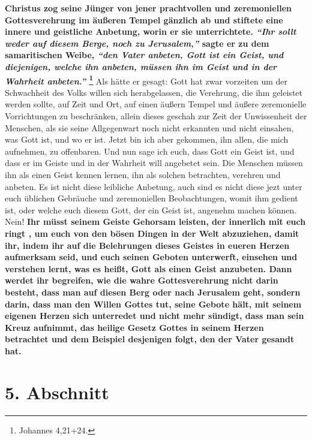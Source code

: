   
\textbf{Christus zog seine Jünger von jener prachtvollen und zeremoniellen
Gottesverehrung im äußeren Tempel gänzlich ab und stiftete eine innere und
geistliche Anbetung, worin er sie unterrichtete.
\textit{"`Ihr sollt weder auf diesem Berge, noch zu Jerusalem,"'}
sagte er zu dem samaritischen Weibe,
\textit{"`den Vater anbeten, Gott ist ein Geist, und diejenigen, welche ihn
anbeten, müssen ihn im Geist und in der Wahrheit anbeten."'}
\footnote{Johannes 4,21+24.}
}
Als hätte er
gesagt: Gott hat zwar vorzeiten um der Schwachheit des Volks willen sich
herabgelassen, die Verehrung, die ihm geleistet werden sollte, auf Zeit und Ort,
auf einen äußern Tempel und äußere zeremonielle Vorrichtungen zu beschränken,
allein dieses geschah zur Zeit der Unwissenheit der Menschen, als sie seine
Allgegenwart noch nicht erkannten und nicht einsahen, was Gott ist, und wo er
ist. Jetzt bin ich aber gekommen, ihn allen, die mich aufnehmen, zu offenbaren.
Und nun sage ich euch, dass Gott ein Geist ist, und dass er im Geiste und in der
Wahrheit will angebetet sein. Die Menschen müssen ihn als einen Geist kennen
lernen, ihn als solchen betrachten, verehren und anbeten. Es ist nicht diese
leibliche Anbetung, auch sind es nicht diese
jezt unter euch üblichen Gebräuche
und zeremoniellen Beobachtungen, womit ihm gedient ist, oder welche euch diesem
Gott, der ein Geist ist, angenehm machen können. Nein!
\label{ref:05_04_wahre_anbetung}
\textbf{Ihr müsst seinem Geiste
Gehorsam leisten, der innerlich mit euch ringt , um euch von den bösen Dingen in
der Welt abzuziehen, damit ihr, indem ihr auf die Belehrungen dieses Geistes in
eueren Herzen aufmerksam seid, und euch seinen Geboten unterwerft, einsehen und
verstehen lernt, was es heißt, Gott als einen Geist anzubeten. Dann werdet ihr
begreifen, wie die wahre Gottesverehrung nicht darin besteht, dass man auf
diesen Berg oder nach Jerusalem geht, sondern darin, dass man den Willen Gottes
tut, seine Gebote hält, mit seinem eigenen Herzen sich unterredet und nicht
mehr sündigt, dass man sein Kreuz aufnimmt, das heilige Gesetz Gottes in seinem
Herzen betrachtet und dem Beispiel desjenigen folgt, den der Vater gesandt
hat.}

\section{5. Abschnitt} \label{kap5_ab5}

